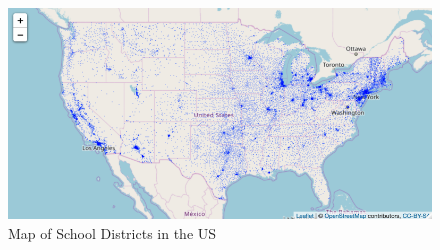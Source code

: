 \documentclass[11pt]{article}
\begin{document}
\begin{figure}[!hbtp]
\centering
\caption{Map of School Districts in the US}\label{schooldistrictfig}
\includegraphics[width=12cm]{../../analysis/Output/img/LEAMap.png}
\end{figure} 

\clearpage

%
%
\end{document}
